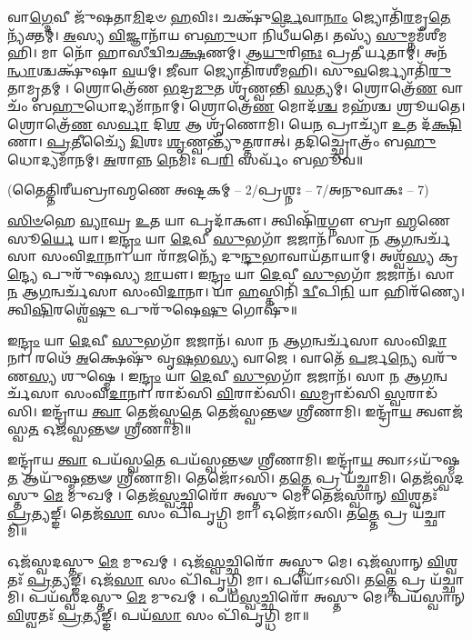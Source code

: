 𑌵𑌾\-\ul{𑌗𑍍𑌦𑍇}\-𑌵𑍀 𑌜𑍁᳴𑌷𑌤𑌾\-\ul{𑌮𑌿}\-𑌦𑍞 \ul{𑌹}\-𑌵𑌿𑌃।
𑌚𑌕𑍍𑌷𑍁᳴\-\ul{𑌰𑍍𑌦𑍇}\-𑌵𑌾\-\ul{𑌨𑌾𑌂} 𑌜𑍍𑌯𑍋𑌤𑌿᳴\-\ul{𑌰}\-𑌮𑍃\-\ul{𑌤𑍇} 𑌨𑍍𑌯᳴𑌕𑍍𑌤𑌮𑍍।
\-\ul{𑌅}\-𑌸𑍍𑌯 \ul{𑌵𑌿}\-𑌜𑍍𑌞𑌾𑌨𑌾᳴𑌯 𑌬\-\ul{𑌹𑍁}\-𑌧𑌾 𑌨𑌿𑌧𑍀᳴𑌯𑌤𑍇।
𑌤𑌸𑍍𑌯᳴ \ul{𑌸𑍁}\-𑌮𑍍𑌨𑌮᳴𑌶𑍀𑌮𑌹𑌿।
𑌮𑌾 𑌨𑍋᳴ 𑌹𑌾𑌸𑍀𑌦𑍍𑌵𑌿𑌚\-\ul{𑌕𑍍𑌷}\-𑌣𑌮𑍍।
𑌆\-\ul{𑌯𑍁}\-𑌰𑌿\-\ul{𑌨𑍍𑌨𑌃} 𑌪𑍍𑌰𑌤𑍀𑌰𑍍𑌯𑌤𑌾𑌮𑍍।
𑌅𑌨᳴\-\ul{𑌨𑍍𑌧𑌾}\-𑌶𑍍𑌚𑌕𑍍𑌷𑍁᳴𑌷𑌾 \ul{𑌵}\-𑌯𑌮𑍍।
\-\ul{𑌜𑍀}\-𑌵𑌾 𑌜𑍍𑌯𑍋𑌤𑌿᳴𑌰𑌶𑍀𑌮𑌹𑌿।
𑌸𑍁\-\ul{𑌵}\-𑌰𑍍𑌜𑍍𑌯𑍋𑌤𑌿᳴\-\ul{𑌰𑍁}\-𑌤𑌾𑌮𑍃𑌤𑌮𑍍।
𑌶𑍍𑌰𑍋𑌤𑍍𑌰𑍇᳴𑌣 \ul{𑌭}\-𑌦𑍍𑌰\-\ul{𑌮𑍁}\-𑌤 𑌶𑍃᳴𑌣𑍍𑌵𑌨𑍍𑌤𑌿 \ul{𑌸}\-𑌤𑍍𑌯𑌮𑍍।
𑌶𑍍𑌰𑍋𑌤𑍍𑌰𑍇᳴\-\ul{𑌣} 𑌵𑌾𑌚𑌂᳴ 𑌬\-\ul{𑌹𑍁}\-𑌧𑍋𑌦𑍍𑌯𑌮𑌾᳴𑌨𑌾𑌮𑍍।
𑌶𑍍𑌰𑍋𑌤𑍍𑌰𑍇᳴\-\ul{𑌣} 𑌮𑍋𑌦᳴\-\ul{𑌶𑍍𑌚} 𑌮𑌹᳴𑌶𑍍𑌚 𑌶𑍍𑌰𑍂𑌯𑌤𑍇।
𑌶𑍍𑌰𑍋𑌤𑍍𑌰𑍇᳴\-\ul{𑌣} 𑌸\-\ul{𑌰𑍍𑌵𑌾} 𑌦𑌿\-\ul{𑌶} 𑌆 𑌶𑍃᳴𑌣𑍋𑌮𑌿।
𑌯𑍇\-\ul{𑌨} 𑌪𑍍𑌰𑌾𑌚𑍍𑌯𑌾᳴ \ul{𑌉}\-𑌤 𑌦᳴\-\ul{𑌕𑍍𑌷𑌿}\-𑌣𑌾।
\-\ul{𑌪𑍍𑌰}\-𑌤𑍀𑌚𑍍𑌯𑍈᳴ \ul{𑌦𑌿}\-𑌶𑌃 \ul{𑌶𑍃}\-𑌣𑍍𑌵𑌨𑍍𑌤𑍍𑌯𑍁᳴\-\ul{𑌤𑍍𑌤}\-𑌰𑌾𑌤𑍍।
𑌤𑌦𑌿𑌚𑍍𑌛𑍍𑌰𑍋𑌤𑍍𑌰𑌂᳴ 𑌬\-\ul{𑌹𑍁}\-𑌧𑍋𑌦𑍍𑌯𑌮𑌾᳴𑌨𑌮𑍍।
\-\ul{𑌅}\-𑌰𑌾𑌨𑍍𑌨 \ul{𑌨𑍇}\-𑌮𑌿𑌃 𑌪\-\ul{𑌰𑌿} 𑌸𑌰𑍍𑌵𑌂᳴ 𑌬𑌭𑍂𑌵॥

\centerline{\scriptsize (𑌤𑍈𑌤𑍍𑌤𑌿𑌰𑍀𑌯𑌬𑍍𑌰𑌾𑌹𑍍𑌮𑌣𑍇 𑌅𑌷𑍍𑌟𑌕𑌮𑍍 – 2/𑌪𑍍𑌰𑌶𑍍𑌨𑌃 – 7/𑌅𑌨𑍁𑌵𑌾𑌕𑌃 – 7)}
\-\ul{𑌸𑌿}\-\-\ul{𑍞}\-𑌹𑍇 \ul{𑌵𑍍𑌯𑌾}\-𑌘𑍍𑌰 \ul{𑌉}\-𑌤 𑌯𑌾 𑌪𑍃𑌦𑌾᳴𑌕𑍗।
𑌤𑍍𑌵𑌿𑌷𑌿᳴\-\ul{𑌰}\-𑌗𑍍𑌨𑍗 𑌬𑍍𑌰𑌾\-\ul{𑌹𑍍𑌮}\-𑌣𑍇 𑌸𑍂\-\ul{𑌰𑍍𑌯𑍇} 𑌯𑌾।
𑌇\-\ul{𑌨𑍍𑌦𑍍𑌰𑌂} 𑌯𑌾 \ul{𑌦𑍇}\-𑌵𑍀 \ul{𑌸𑍁}\-𑌭𑌗𑌾᳴ \ul{𑌜}\-𑌜𑌾𑌨᳴।
𑌸𑌾 \ul{𑌨} 𑌆\-\ul{𑌗}\-𑌨𑍍𑌵𑌰𑍍𑌚᳴𑌸𑌾 𑌸𑌂𑌵𑌿\-\ul{𑌦𑌾}\-𑌨𑌾।
𑌯𑌾 𑌰𑌾᳴\-\ul{𑌜}\-𑌨𑍍𑌯𑍇᳴ 𑌦𑍁\-\ul{𑌨𑍍𑌦𑍁}\-𑌭𑌾𑌵𑌾𑌯᳴𑌤𑌾𑌯𑌾𑌮𑍍।
𑌅𑌶𑍍𑌵᳴\-\ul{𑌸𑍍𑌯} 𑌕𑍍𑌰\-\ul{𑌨𑍍𑌦𑍍𑌯𑍇} 𑌪𑍁𑌰𑍁᳴𑌷𑌸𑍍𑌯 \ul{𑌮𑌾}\-𑌯𑍗।
𑌇\-\ul{𑌨𑍍𑌦𑍍𑌰𑌂} 𑌯𑌾 \ul{𑌦𑍇}\-𑌵𑍀 \ul{𑌸𑍁}\-𑌭𑌗𑌾᳴ \ul{𑌜}\-𑌜𑌾𑌨᳴।
𑌸𑌾 \ul{𑌨} 𑌆\-\ul{𑌗}\-𑌨𑍍𑌵𑌰𑍍𑌚᳴𑌸𑌾 𑌸𑌂𑌵𑌿\-\ul{𑌦𑌾}\-𑌨𑌾।
𑌯𑌾 \ul{𑌹}\-𑌸𑍍𑌤𑌿𑌨𑌿᳴ \ul{𑌦𑍍𑌵𑍀}\-𑌪𑌿\-\ul{𑌨𑌿} 𑌯𑌾 𑌹𑌿𑌰᳴𑌣𑍍𑌯𑍇।
𑌤𑍍𑌵𑌿\-\ul{𑌷𑌿}\-𑌰𑌶𑍍𑌵𑍇᳴\-\ul{𑌷𑍁} 𑌪𑍁𑌰𑍁᳴𑌷𑍇\-\ul{𑌷𑍁} 𑌗𑍋𑌷𑍁᳴॥

𑌇\-\ul{𑌨𑍍𑌦𑍍𑌰𑌂} 𑌯𑌾 \ul{𑌦𑍇}\-𑌵𑍀 \ul{𑌸𑍁}\-𑌭𑌗𑌾᳴ \ul{𑌜}\-𑌜𑌾𑌨᳴।
𑌸𑌾 \ul{𑌨} 𑌆\-\ul{𑌗}\-𑌨𑍍𑌵𑌰𑍍𑌚᳴𑌸𑌾 𑌸𑌂𑌵𑌿\-\ul{𑌦𑌾}\-𑌨𑌾।
𑌰𑌥𑍇᳴ \ul{𑌅}\-𑌕𑍍𑌷𑍇𑌷𑍁᳴ 𑌵𑍃\-\ul{𑌷}\-𑌭\-\ul{𑌸𑍍𑌯} 𑌵𑌾𑌜𑍇।
𑌵𑌾𑌤𑍇᳴ \ul{𑌪}\-𑌰𑍍𑌜\-\ul{𑌨𑍍𑌯𑍇} 𑌵𑌰𑍁᳴𑌣\-\ul{𑌸𑍍𑌯} 𑌶𑍁𑌷𑍍𑌮𑍇।
𑌇\-\ul{𑌨𑍍𑌦𑍍𑌰𑌂} 𑌯𑌾 \ul{𑌦𑍇}\-𑌵𑍀 \ul{𑌸𑍁}\-𑌭𑌗𑌾᳴ \ul{𑌜}\-𑌜𑌾𑌨᳴।
𑌸𑌾 \ul{𑌨} 𑌆\-\ul{𑌗}\-𑌨𑍍𑌵𑌰𑍍𑌚᳴𑌸𑌾 𑌸𑌂𑌵𑌿\-\ul{𑌦𑌾}\-𑌨𑌾।
𑌰𑌾𑌡᳴𑌸𑌿 \ul{𑌵𑌿}\-𑌰𑌾𑌡᳴𑌸𑌿।
\-\ul{𑌸}\-𑌮𑍍𑌰𑌾𑌡᳴𑌸𑌿 \ul{𑌸𑍍𑌵}\-𑌰𑌾𑌡᳴𑌸𑌿।
𑌇𑌨𑍍𑌦𑍍𑌰𑌾᳴𑌯 \ul{𑌤𑍍𑌵𑌾} 𑌤𑍇𑌜᳴𑌸𑍍𑌵\-\ul{𑌤𑍇} 𑌤𑍇𑌜᳴𑌸𑍍𑌵𑌨𑍍𑌤𑍟 𑌶𑍍𑌰𑍀𑌣𑌾𑌮𑌿।
𑌇𑌨𑍍𑌦𑍍𑌰𑌾᳴\-\ul{𑌯} 𑌤𑍍𑌵𑍗𑌜᳴𑌸𑍍𑌵\-\ul{𑌤} 𑌓𑌜᳴𑌸𑍍𑌵𑌨𑍍𑌤𑍟 𑌶𑍍𑌰𑍀𑌣𑌾𑌮𑌿॥

𑌇𑌨𑍍𑌦𑍍𑌰𑌾᳴𑌯 \ul{𑌤𑍍𑌵𑌾} 𑌪𑌯᳴𑌸𑍍𑌵\-\ul{𑌤𑍇} 𑌪𑌯᳴𑌸𑍍𑌵𑌨𑍍𑌤𑍟 𑌶𑍍𑌰𑍀𑌣𑌾𑌮𑌿।
𑌇𑌨𑍍𑌦𑍍𑌰𑌾᳴\-\ul{𑌯} 𑌤𑍍𑌵𑌾𑌽𑌽𑌯𑍁᳴𑌷𑍍𑌮\-\ul{𑌤} 𑌆𑌯𑍁᳴𑌷𑍍𑌮𑌨𑍍𑌤𑍟 𑌶𑍍𑌰𑍀𑌣𑌾𑌮𑌿।
𑌤𑍇𑌜𑍋᳴𑌽𑌸𑌿।
𑌤\-\ul{𑌤𑍍𑌤𑍇} 𑌪𑍍𑌰 𑌯᳴𑌚𑍍𑌛𑌾𑌮𑌿।
𑌤𑍇𑌜᳴𑌸𑍍𑌵𑌦𑌸𑍍𑌤𑍁 \ul{𑌮𑍇} 𑌮𑍁𑌖𑌮𑍍।
𑌤𑍇𑌜᳴\-\ul{𑌸𑍍𑌵}\-𑌚𑍍𑌛𑌿𑌰𑍋᳴ 𑌅𑌸𑍍𑌤𑍁 𑌮𑍇।
𑌤𑍇𑌜᳴𑌸𑍍𑌵𑌾𑌨𑍍 \ul{𑌵𑌿}\-𑌶𑍍𑌵𑌤𑌃᳴ \ul{𑌪𑍍𑌰}\-𑌤𑍍𑌯𑌙𑍍𑌙𑍍।
𑌤𑍇𑌜᳴\-\ul{𑌸𑌾} 𑌸𑌂 𑌪𑌿᳴𑌪𑍃𑌗𑍍𑌧𑌿 𑌮𑌾।
𑌓𑌜𑍋᳴𑌽𑌸𑌿।
𑌤\-\ul{𑌤𑍍𑌤𑍇} 𑌪𑍍𑌰 𑌯᳴𑌚𑍍𑌛𑌾𑌮𑌿॥

𑌓𑌜᳴𑌸𑍍𑌵𑌦𑌸𑍍𑌤𑍁 \ul{𑌮𑍇} 𑌮𑍁𑌖𑌮𑍍।
𑌓𑌜᳴\-\ul{𑌸𑍍𑌵}\-𑌚𑍍𑌛𑌿𑌰𑍋᳴ 𑌅𑌸𑍍𑌤𑍁 𑌮𑍇।
𑌓𑌜᳴𑌸𑍍𑌵𑌾𑌨𑍍 \ul{𑌵𑌿}\-𑌶𑍍𑌵𑌤𑌃᳴ \ul{𑌪𑍍𑌰}\-𑌤𑍍𑌯𑌙𑍍𑌙𑍍।
𑌓𑌜᳴\-\ul{𑌸𑌾} 𑌸𑌂 𑌪𑌿᳴𑌪𑍃𑌗𑍍𑌧𑌿 𑌮𑌾।
𑌪𑌯𑍋᳴𑌽𑌸𑌿।
𑌤\-\ul{𑌤𑍍𑌤𑍇} 𑌪𑍍𑌰 𑌯᳴𑌚𑍍𑌛𑌾𑌮𑌿।
𑌪𑌯᳴𑌸𑍍𑌵𑌦𑌸𑍍𑌤𑍁 \ul{𑌮𑍇} 𑌮𑍁𑌖𑌮𑍍।
𑌪𑌯᳴\-\ul{𑌸𑍍𑌵}\-𑌚𑍍𑌛𑌿𑌰𑍋᳴ 𑌅𑌸𑍍𑌤𑍁 𑌮𑍇।
𑌪𑌯᳴𑌸𑍍𑌵𑌾𑌨𑍍 \ul{𑌵𑌿}\-𑌶𑍍𑌵𑌤𑌃᳴ \ul{𑌪𑍍𑌰}\-𑌤𑍍𑌯𑌙𑍍𑌙𑍍।
𑌪𑌯᳴\-\ul{𑌸𑌾} 𑌸𑌂 𑌪𑌿᳴𑌪𑍃𑌗𑍍𑌧𑌿 𑌮𑌾॥

